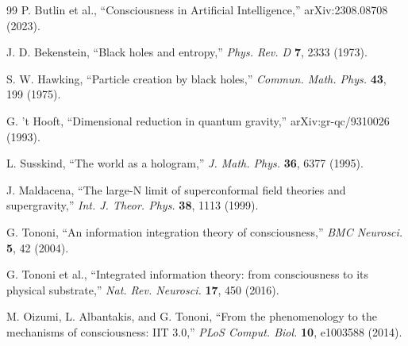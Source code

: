 \documentclass[12pt,a4paper]{article}
\theoremstyle{definition}
\theoremstyle{remark}
\begin{document}
\begin{thebibliography}{99}
P. Butlin et al., ``Consciousness in Artificial Intelligence,'' arXiv:2308.08708 (2023).

J. D. Bekenstein, ``Black holes and entropy,'' \textit{Phys. Rev. D} \textbf{7}, 2333 (1973).

S. W. Hawking, ``Particle creation by black holes,'' \textit{Commun. Math. Phys.} \textbf{43}, 199 (1975).

G. 't Hooft, ``Dimensional reduction in quantum gravity,'' arXiv:gr-qc/9310026 (1993).

L. Susskind, ``The world as a hologram,'' \textit{J. Math. Phys.} \textbf{36}, 6377 (1995).

J. Maldacena, ``The large-N limit of superconformal field theories and supergravity,'' \textit{Int. J. Theor. Phys.} \textbf{38}, 1113 (1999).

G. Tononi, ``An information integration theory of consciousness,'' \textit{BMC Neurosci.} \textbf{5}, 42 (2004).

G. Tononi et al., ``Integrated information theory: from consciousness to its physical substrate,'' \textit{Nat. Rev. Neurosci.} \textbf{17}, 450 (2016).

M. Oizumi, L. Albantakis, and G. Tononi, ``From the phenomenology to the mechanisms of consciousness: IIT 3.0,'' \textit{PLoS Comput. Biol.} \textbf{10}, e1003588 (2014).

\end{thebibliography}
\end{document}
